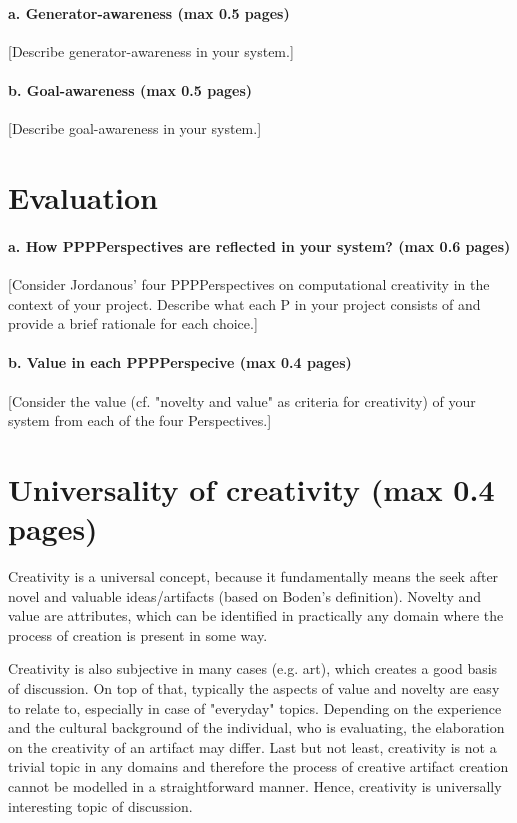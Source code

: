 \documentclass[english]{tktltiki}
\begin{document}
    \paragraph{a. Generator-awareness (max 0.5 pages)}
    [Describe generator-awareness in your system.]
    
    \paragraph{b. Goal-awareness (max 0.5 pages)} 
    [Describe goal-awareness in your system.]
    
    
    
    \pagebreak
    \section{Evaluation}
    
    \paragraph{a. How PPPPerspectives are reflected in your system? (max 0.6 pages)}
    
    [Consider Jordanous' four PPPPerspectives on computational creativity in the context of your project. Describe what each P in your project consists of and provide a brief rationale for each choice.]
    
    \paragraph{b. Value in each PPPPerspecive (max 0.4 pages) }
    
    [Consider the value (cf. "novelty and value" as criteria for creativity) of your system from each of the four Perspectives.]
    
    \pagebreak
    \section{Universality of creativity (max 0.4 pages)}
    Creativity is a universal concept, because it fundamentally means the seek after novel and valuable ideas/artifacts (based on Boden's definition). Novelty and value are attributes, which can be identified in practically any domain where the process of creation is present in some way. 
    
    Creativity is also subjective in many cases (e.g. art), which creates a good basis of discussion. On top of that, typically the aspects of value and novelty are easy to relate to, especially in case of "everyday" topics. Depending on the experience and the cultural background of the individual, who is evaluating, the elaboration on the creativity of an artifact may differ. Last but not least, creativity is not a trivial topic in any domains and therefore the process of creative artifact creation cannot be modelled in a straightforward manner. Hence, creativity is universally interesting topic of discussion.
    
\end{document}
